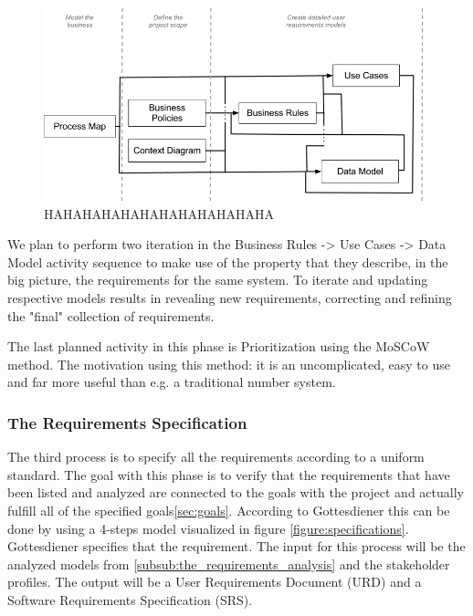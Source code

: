 \documentclass[a4paper]{article}
\begin{document}
\begin{figure}[!ht]
	\centering
		\includegraphics[width=1\textwidth]{images/model_the_business.png}
	\caption{HAHAHAHAHAHAHAHAHAHAHAHA}
	\label{figure:business}
\end{figure}
     
We plan to perform two iteration in the Business Rules -> Use Cases -> Data Model activity sequence to make use of the property that they describe, in the big picture, the requirements for the same system. To iterate and updating respective models results in revealing new requirements, correcting and refining the "final" collection of requirements.

The last planned activity in this phase is Prioritization using the MoSCoW method. The motivation using this method: it is an uncomplicated, easy to use and far more useful than e.g. a traditional number system\cite{coleyconsulting}.

\subsubsection{The Requirements Specification}
\label{subsub:the_requirements_specification}

The third process is to specify all the requirements according to a uniform standard. The goal with this phase is to verify that the requirements that have been listed and analyzed are connected to the goals with the project and actually fulfill all of the specified goals\ref{sec:goals}. According to Gottesdiener\cite{gott232} this can be done by using a 4-steps model visualized in figure \ref{figure:specifications}. Gottesdiener specifies that the requirement. The input for this process will be the analyzed models from \ref{subsub:the_requirements_analysis} and the stakeholder profiles. The output will be a User Requirements Document (URD) and a Software Requirements Specification (SRS).
\end{document}
